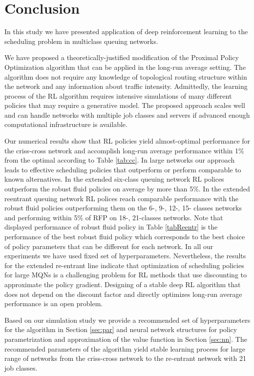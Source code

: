 \documentclass[11pt]{article}
\theoremstyle{definition}
\numberwithin{equation}{section}
\begin{document}
\section{Conclusion}

In this study we have presented application of
deep reinforcement learning to the scheduling problem in multiclass queuing networks.




We have  proposed a theoretically-justified modification of the Proximal Policy Optimization algorithm that can be applied in the long-run average setting.  The algorithm does not require any knowledge of  topological routing structure within the network and any information about traffic intensity. Admittedly, the learning process of the RL algorithm requires intensive simulations of many different policies that may require a generative model. The proposed approach scales well and can handle networks with multiple job classes and servers if advanced enough computational infrastructure is available.






Our numerical results show that  RL policies yield almost-optimal performance for the criss-cross network and accomplish  long-run average performance within 1\% from the optimal according to Table \ref{tab:cc}. In large networks our approach leads to effective scheduling policies that outperform or perform comparable to known alternatives. In the extended six-class queuing network RL polices  outperform  the robust fluid policies on average by more than  5\%. In the extended reentrant queuing network RL polices reach comparable performance with the robust fluid policies outperforming them on the 6-, 9-, 12-, 15- classes  networks  and performing within 5\% of
RFP on 18-, 21-classes networks. Note that displayed  performance of robust fluid policy in Table \ref{tabReentr} is the performance of the best  robust fluid policy which corresponds to the best choice of policy parameters that can be different for each network. In all our experiments we have used fixed set of hyperparameters.
Nevertheless, the results for the extended re-entrant line indicate that optimization of scheduling policies for large MQNs is a challenging problem for RL methods that use discounting to approximate the policy gradient. Designing of  a stable deep RL algorithm that does not depend on the discount factor and directly optimizes long-run average performance  is an open problem.


Based on our simulation study we  provide a recommended set of hyperparameters for the algorithm in Section \ref{sec:par}  and  neural network structures for policy parametrization and approximation of the value function in Section \ref{sec:nn}. The recommended parameters of the algorithm yield stable learning process for large range of networks from the criss-cross network to the re-entrant network with 21 job classes.
\end{document}
